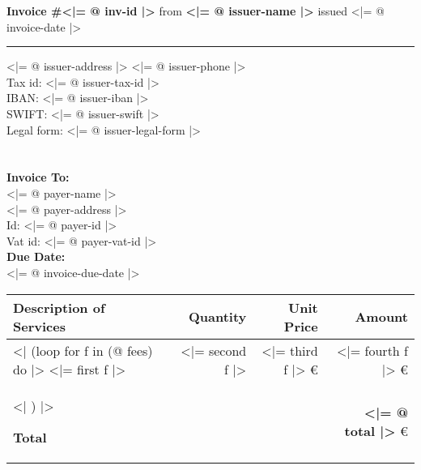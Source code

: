 \documentclass{article}
\def \tab {\hspace*{3ex}}
\begin{document}
\hfill{\Huge\textbf{Invoice \#<|= @ inv-id |>}}\hfill
\bigskip\break
{\large from \textbf{<|= @ issuer-name |>}}
\hfill issued <|= @ invoice-date |> \\
\hrule

<|= @ issuer-address |>
\hfill <|= @ issuer-phone |> \\
\tab Tax id: <|= @ issuer-tax-id |> \\
\tab IBAN: <|= @ issuer-iban |> \\
\tab SWIFT: <|= @ issuer-swift |> \\
\tab Legal form: <|= @ issuer-legal-form |> \\
\\ \\
\textbf{Invoice To:} \\
\tab <|= @ payer-name |> \\
\tab <|= @ payer-address |> \\
\tab Id: <|= @ payer-id |> \\
\tab Vat id: <|= @ payer-vat-id |> \\

\textbf{Due Date:} \\
\tab <|= @ invoice-due-date |> \\

\begin{longtable}{l r r r}
  \textbf{Description of Services} & \textbf{Quantity} & \textbf{Unit Price} & \textbf{Amount} \\
  \hline

  <| (loop for f in (@ fees) do |>
  \tab <|= first f |> & <|= second f |> & <|= third f |> € & <|= fourth f |> € \\
  <| ) |>

  \hline
  \textbf{Total} & & & \textbf{<|= @ total |>} €
\end{longtable}
\end{document}
